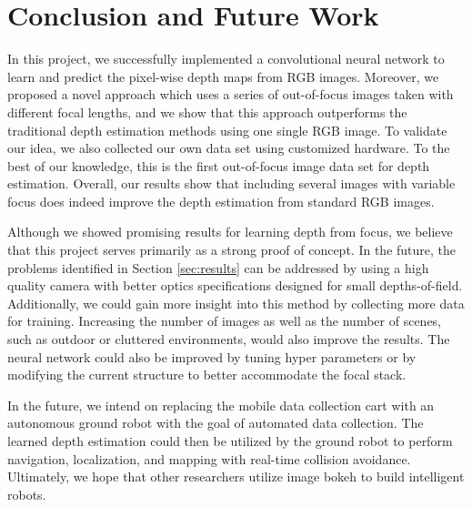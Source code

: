 \documentclass[letterpaper, 10 pt, conference]{ieeeconf}  %
\begin{document}
\section{Conclusion and Future Work}
\label{sec:conclusion}

In this project, we successfully implemented a convolutional neural network to learn and predict the pixel-wise depth maps from RGB images. Moreover, we proposed a novel approach which uses a series of out-of-focus images taken with different focal lengths, and we show that this approach outperforms the traditional depth estimation methods using one single RGB image. To validate our idea, we also collected our own data set using customized hardware. To the best of our knowledge, this is the first out-of-focus image data set for depth estimation. Overall, our results show that including several images with variable focus does indeed improve the depth estimation from standard RGB images. 

Although we showed promising results for learning depth from focus, we believe that this project serves primarily as a strong proof of concept. In the future, the problems identified in Section \ref{sec:results} can be addressed by using a high quality camera with better optics specifications designed for small depths-of-field. Additionally, we could gain more insight into this method by collecting more data for training. Increasing the number of images as well as the number of scenes, such as outdoor or cluttered environments, would also improve the results. The neural network could also be improved by tuning hyper parameters or by modifying the current structure to better accommodate the focal stack. 

In the future, we intend on replacing the mobile data collection cart with an autonomous ground robot with the goal of automated data collection. The learned depth estimation could then be utilized by the ground robot to perform navigation, localization, and mapping with real-time collision avoidance. Ultimately, we hope that other researchers utilize image bokeh to build intelligent robots. 





\pagebreak

\end{document}
